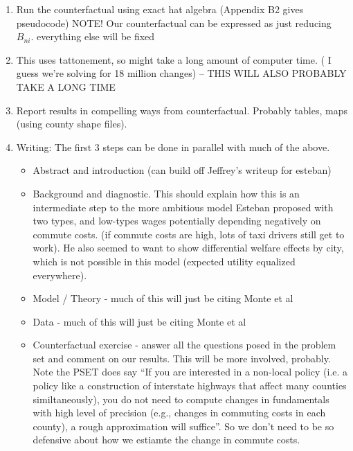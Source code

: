 \documentclass{article}
\begin{document}
\begin{enumerate}
    \item Run the counterfactual using exact hat algebra (Appendix B2 gives pseudocode)  NOTE! Our counterfactual can be expressed as just reducing $B_{ni}$. everything else will be fixed
    \item This uses tattonement, so might take a long amount of computer time. ( I guess we're solving for 18 million changes) -- THIS WILL ALSO PROBABLY TAKE A LONG TIME
    \item  Report results in compelling ways from counterfactual. Probably tables, maps (using county shape files). 
    \item Writing: The first 3 steps can be done in parallel with much of the above.
    \begin{itemize}
        \item Abstract and introduction (can build off Jeffrey's writeup for esteban)
        \item Background and diagnostic. This should explain how this is an intermediate step to the more ambitious model Esteban proposed with two types, and low-types wages potentially depending negatively on commute costs.  (if commute costs are high, lots of taxi drivers still get to work). He also seemed to want to show differential welfare effects by city, which is not possible in this model (expected utility equalized everywhere).
    \item Model / Theory - much of this will just be citing Monte et al
    \item Data   - much of this will just be citing Monte et al
    \item Counterfactual exercise - answer all the questions posed in the problem set and comment on our results. This will be more involved, probably. Note the PSET does say ``If you are interested in a non-local policy (i.e. a policy like a construction of interstate highways that affect many counties similtaneously), you do not need to compute changes in fundamentals with high level of precision (e.g., changes in commuting costs in each county), a rough approximation will suffice''. So we don't need to be so defensive about how we estiamte the change in commute costs.
    \end{itemize}
\end{enumerate}
\end{document}
